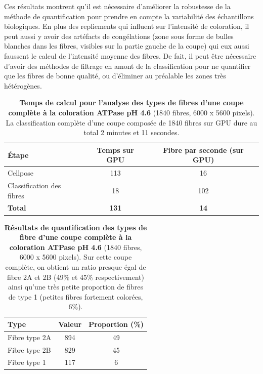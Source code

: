Ces résultats montrent qu'il est nécessaire d'améliorer la robustesse de la méthode de quantification pour prendre en compte la variabilité des échantillons biologiques. En plus des repliements qui influent sur l'intensité de coloration, il peut aussi y avoir des artéfacts de congélations (zone sous forme de bulles blanches dans les fibres, visibles sur la partie gauche de la coupe) qui eux aussi faussent le calcul de l'intensité moyenne des fibres. De fait, il peut être nécessaire d'avoir des méthodes de filtrage en amont de la classification pour ne quantifier que les fibres de bonne qualité, ou d'éliminer au préalable les zones très hétérogènes.

\begin{table}[htbp]
\centering
\caption[Temps de calcul pour l'analyse des types de fibres d'une coupe complète ATPase]{\textbf{Temps de calcul pour l'analyse des types de fibres d'une coupe complète à la coloration ATPase pH 4.6} (1840 fibres, 6000 x 5600 pixels). La classification complète d'une coupe composée de 1840 fibres sur GPU dure au total 2 minutes et 11 secondes.}
\label{tab:atp_wsi_timetable}
\begin{tabular}{|l|c|c|}
\hline
\textbf{Étape} & \textbf{Temps sur GPU} & \textbf{Fibre par seconde (sur GPU)} \\
\hline
Cellpose & 113 & 16 \\
\hline
Classification des fibres & 18 & 102 \\
\hline
\textbf{Total} & \textbf{131} & \textbf{14} \\
\hline
\end{tabular}
\end{table}

\begin{table}[htbp]
\centering
\caption[Résultats de quantification des types de fibre d'une coupe complète ATPase]{\textbf{Résultats de quantification des types de fibre d'une coupe complète à la coloration ATPase pH 4.6} (1840 fibres, 6000 x 5600 pixels). Sur cette coupe complète, on obtient un ratio presque égal de fibre 2A et 2B (49\% et 45\% respectivement) ainsi qu'une très petite proportion de fibres de type 1 (petites fibres fortement colorées, 6\%).}
\label{tab:atp_wsi_resultstable}
\begin{tabular}{|l|c|c|}
\hline
\textbf{Type} & \textbf{Valeur} & \textbf{Proportion (\%)} \\
\hline
Fibre type 2A & 894 & 49 \\
\hline
Fibre type 2B & 829 & 45 \\
\hline
Fibre type 1 & 117 & 6 \\
\hline
\end{tabular}
\end{table}

